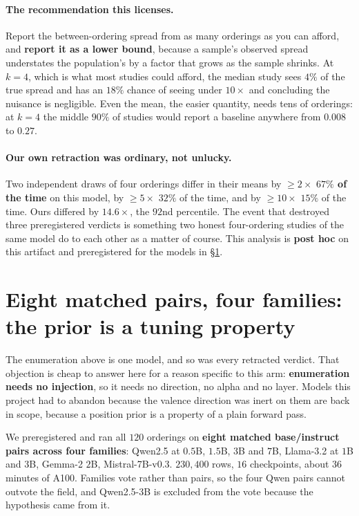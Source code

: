 \documentclass{article}
\begin{document}
\paragraph{The recommendation this licenses.} Report the between-ordering spread from as many
orderings as you can afford, and \textbf{report it as a lower bound}, because a sample's observed
spread understates the population's by a factor that grows as the sample shrinks. At $k=4$, which is
what most studies could afford, the median study sees $4\%$ of the true spread and has an $18\%$
chance of seeing under $10\times$ and concluding the nuisance is negligible. Even the mean, the
easier quantity, needs tens of orderings: at $k=4$ the middle $90\%$ of studies would report a
baseline anywhere from $0.008$ to $0.27$.

\paragraph{Our own retraction was ordinary, not unlucky.} Two independent draws of four orderings
differ in their means by $\geq 2\times$ \textbf{$67\%$ of the time} on this model, by $\geq 5\times$
$32\%$ of the time, and by $\geq 10\times$ $15\%$ of the time. Ours differed by $14.6\times$, the
$92$nd percentile. The event that destroyed three preregistered verdicts is something two honest
four-ordering studies of the same model do to each other as a matter of course. This analysis is
\textbf{post hoc} on this artifact and preregistered for the models in \S\ref{sec:families}.

\section{Eight matched pairs, four families: the prior is a tuning property}
\label{sec:families}

The enumeration above is one model, and so was every retracted verdict. That objection is cheap to
answer here for a reason specific to this arm: \textbf{enumeration needs no injection}, so it needs
no direction, no alpha and no layer. Models this project had to abandon because the valence
direction was inert on them are back in scope, because a position prior is a property of a plain
forward pass.

We preregistered and ran all $120$ orderings on \textbf{eight matched base/instruct pairs across
four families}: Qwen2.5 at $0.5$B, $1.5$B, $3$B and $7$B, Llama-3.2 at $1$B and $3$B, Gemma-2 $2$B,
Mistral-7B-v0.3. $230{,}400$ rows, $16$ checkpoints, about $36$ minutes of A100. Families vote
rather than pairs, so the four Qwen pairs cannot outvote the field, and Qwen2.5-3B is excluded from
the vote because the hypothesis came from it.
\end{document}
